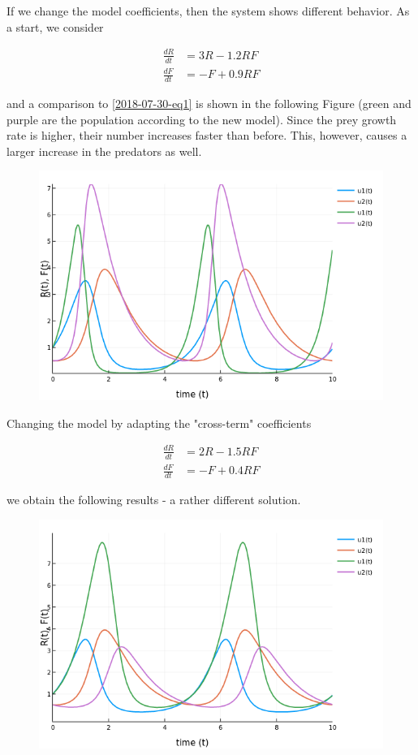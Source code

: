 If we change the model coefficients, then the system shows different behavior. As a start, we consider 

\begin{align*}
\frac{dR}{dt} &= 3R - 1.2RF \\
\frac{dF}{dt} &= -F + 0.9RF
\end{align*}

and a comparison to \eqref{2018-07-30-eq1} is shown in the following Figure (green and purple are the population according to the new model). Since the prey growth rate is higher, their number increases faster than before. This, however, causes a larger increase in the predators as well. 

\begin{figure}[H]
	\includegraphics[scale=0.65]{images/ode_04_04.png}
\end{figure}

Changing the model by adapting the "cross-term" coefficients 

\begin{align*}
\frac{dR}{dt} &= 2R - 1.5RF \\
\frac{dF}{dt} &= -F + 0.4RF
\end{align*}

we obtain the following results - a rather different solution.


\begin{figure}[H]
	\includegraphics[scale=0.65]{images/ode_04_05.png}
\end{figure}


